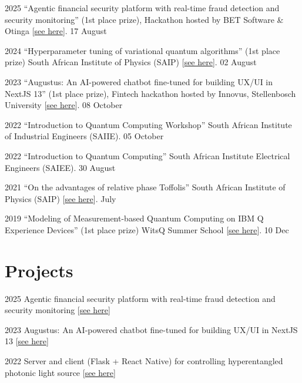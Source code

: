 \documentclass[10pt]{extreport}
\begin{document}
\begin{tablist}
	\item[2025] \tab{}\enquote{Agentic financial security platform with real-time fraud detection and security monitoring} (1st place prize), Hackathon hosted by BET Software \& Otinga [\href{https://github.com/ThamuMnyulwa/bet-hackathon-2025}{see here}]. 17 August
	\item[2024] \tab{}\enquote{Hyperparameter tuning of variational quantum algorithms}  (1st place prize) South
		African Institute of Physics (SAIP) [\href{https://github.com/Unathi-Skosana/posters-n-presentations/blob/main/presentations/saip2024/saip2024_final.pdf}{see here}]. 02 August
	\item[2023]  \tab{} \enquote{Augustus: An AI-powered chatbot fine-tuned for building UX/UI in NextJS 13} (1st place prize), Fintech hackathon hosted by Innovus, Stellenbosch University [\href{https://github.com/Unathi-Skosana/posters-n-presentations/blob/main/presentations/su-innovus-hackathon-2023/export/Augustus-SU-hackathon-presentation.pdf}{see here}]. 08 October
	\item[2022] \tab{}\enquote{Introduction to Quantum Computing Workshop} South African Institute of Industrial Engineers (SAIIE). 05 October
	\item[2022] \tab{}\enquote{Introduction to Quantum Computing} South African Institute Electrical Engineers (SAIEE). 30 August
	\item[2021] \tab{}\enquote{On the advantages of relative phase Toffolis} South
	African Institute of Physics (SAIP) [\href{https://github.com/Unathi-Skosana/posters-n-presentations/blob/main/posters/saip-2021/release/poster.pdf}{see here}].  July
	\item[2019] \tab{}\enquote{Modeling of Measurement-based Quantum Computing on
		IBM Q Experience Devices}  (1st place prize) WitsQ Summer School
		[\href{https://github.com/Unathi-Skosana/posters-n-presentations/blob/main/posters/witsq-summer-school-2019/release/poster.pdf}{see here}]. 10 Dec
\end{tablist}

\section*{Projects}

\begin{tablist}
	\item[2025] \tab{} Agentic financial security platform with real-time fraud detection and security monitoring [\href{https://github.com/ThamuMnyulwa/bet-hackathon-2025}{see here}]
	\item[2023] \tab{} Augustus: An AI-powered chatbot fine-tuned for building UX/UI in NextJS 13 [\href{https://github.com/Unathi-Skosana/augustus}{see here}]
	\item[2022] \tab{}Server and client (Flask + React Native) for controlling hyperentangled photonic light source [\href{https://github.com/Unathi-Skosana/hyperentangled-photons-masters-experiment}{see here}]
\end{tablist}
\end{document}
